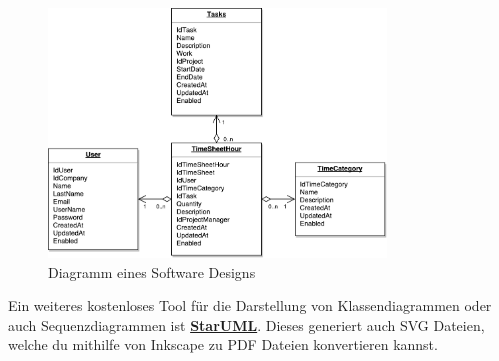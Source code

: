 \begin{figure}[ht]
	\centering
	\includegraphics[width=0.8\textwidth]{content/08_instructions/images/Diagramm.pdf} 
	\caption{Diagramm eines Software Designs}
	\label{fig:Diagramm-DrawIo}
\end{figure}

Ein weiteres kostenloses Tool für die Darstellung von Klassendiagrammen oder auch Sequenzdiagrammen ist \textbf{\href{http://staruml.io/}{StarUML}}. Dieses generiert auch SVG Dateien, welche du mithilfe von Inkscape zu PDF Dateien konvertieren kannst.

